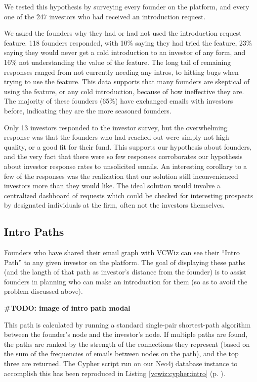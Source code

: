 We tested this hypothesis by surveying every founder on the platform, and every one of the 247 investors who had received an introduction request.

We asked the founders why they had or had not used the introduction request feature. 118 founders responded, with 10\% saying they had tried the feature, 23\% saying they would never get a cold introduction to an investor of any form, and 16\% not understanding the value of the feature. The long tail of remaining responses ranged from not currently needing any intros, to hitting bugs when trying to use the feature. This data supports that many founders are skeptical of using the feature, or any cold introduction, because of how ineffective they are. The majority of these founders (65\%) have exchanged emails with investors before, indicating they are the more seasoned founders.

Only 13 investors responded to the investor survey, but the overwhelming response was that the founders who had reached out were simply not high quality, or a good fit for their fund. This supports our hypothesis about founders, and the very fact that there were so few responses corroborates our hypothesis about investor response rates to unsolicited emails. An interesting corollary to a few of the responses was the realization that our solution still inconvenienced investors more than they would like. The ideal solution would involve a centralized dashboard of requests which could be checked for interesting prospects by designated individuals at the firm, often not the investors themselves.

\subsection{Intro Paths}

Founders who have shared their email graph with VCWiz can see their ``Intro Path'' to any given investor on the platform. The goal of displaying these paths (and the langth of that path as investor's distance from the founder) is to assist founders in planning who can make an introduction for them (so as to avoid the problem discussed above).

\textbf{\#TODO: image of intro path modal}

This path is calculated by running a standard single-pair shortest-path algorithm between the founder's node and the investor's node. If multiple paths are found, the paths are ranked by the strength of the connections they represent (based on the sum of the frequencies of emails between nodes on the path), and the top three are returned. The Cypher script run on our Neo4j database instance to accomplish this has been reproduced in Listing \ref{vcwiz:cypher:intro} (p. \pageref{vcwiz:cypher:intro}).

